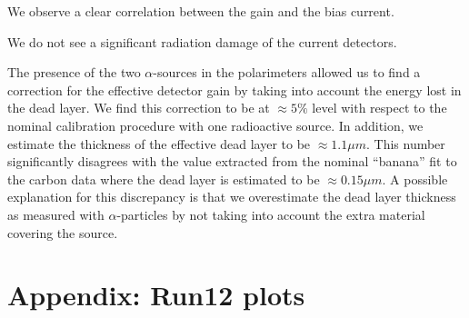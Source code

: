 \documentclass[a4paper,12pt]{article}
\begin{document}
We observe a clear correlation between the gain and the bias current.

We do not see a significant radiation damage of the current detectors.

The presence of the two $\alpha$-sources in the polarimeters allowed us to find
a correction for the effective detector gain by taking into account the energy
lost in the dead layer. We find this correction to be at $\approx 5\%$ level
with respect to the nominal calibration procedure with one radioactive source.
In addition, we estimate the thickness of the effective dead layer to be
$\approx 1.1\mu m$. This number significantly disagrees with the value extracted
from the nominal ``banana'' fit to the carbon data where the dead layer is
estimated to be $\approx 0.15\mu m$. A possible explanation for this discrepancy
is that we overestimate the dead layer thickness as measured with
$\alpha$-particles by not taking into account the extra material covering the
source.


\clearpage
\appendix
\section{Appendix: Run12 plots}
\end{document}
